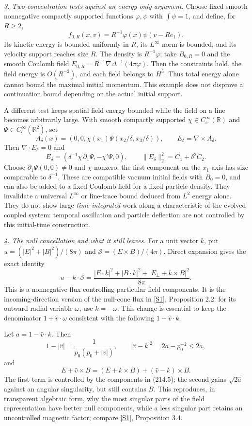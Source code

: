 \documentclass[11pt,a4paper]{article}
\newcommand{\R}{\mathbb{R}}
\newcommand{\sref}[2]{\hyperlink{source:#1:#2}{[S#2]}}
\begin{document}
\textit{3. Two concentration tests against an energy-only argument.}
Choose fixed smooth nonnegative compactly supported functions $\varphi,\psi$
with $\int\psi=1$, and define, for $R\ge2$,
\[
 f_{0,R}(x,v)=R^{-1}\varphi(x)\psi(v-Re_1).
\]
Its kinetic energy is bounded uniformly in $R$, its $L^\infty$ norm is
bounded, and its velocity support reaches size $R$. The density is
$R^{-1}\varphi$; take $B_{0,R}=0$ and the smooth Coulomb field
$E_{0,R}=R^{-1}\nabla\Delta^{-1}(4\pi\varphi)$. Then the constraints hold,
the field energy is $O(R^{-2})$, and each field belongs to $H^5$.
Thus total energy alone cannot bound the maximal initial momentum. This
example does not disprove a continuation bound depending on the actual
initial support.

A different test keeps spatial field energy bounded while the field on a
line becomes arbitrarily large. With smooth compactly supported
$\chi\in C_c^\infty(\R)$ and $\Psi\in C_c^\infty(\R^2)$, set
\[
 A_\delta(x)=(0,0,\chi(x_1)\Psi(x_2/\delta,x_3/\delta)),\qquad
 E_\delta=\nabla\times A_\delta.
\]
Then $\nabla\cdot E_\delta=0$ and
\[
 E_\delta=(\delta^{-1}\chi\,\partial_1\Psi,
                    -\chi'\Psi,0),\qquad
 \|E_\delta\|_2^2=C_1+\delta^2 C_2.
\]
Choose $\partial_1\Psi(0,0)\ne0$ and $\chi$ nonzero; the first component
on the $x_1$-axis has size comparable to $\delta^{-1}$. These are compatible
vacuum initial fields with $B_0=0$, and can also be added to a fixed Coulomb
field for a fixed particle density. They invalidate a universal
$L^\infty$ or line-trace bound deduced from $L^2$ energy alone. They do not
show large \emph{time-integrated} work along a characteristic of the evolved
coupled system: temporal oscillation and particle deflection are not
controlled by this initial-time construction.

\textit{4. The null cancellation and what it still leaves.}
For a unit vector $k$, put
$u=(|E|^2+|B|^2)/(8\pi)$ and $\mathcal S=(E\times B)/(4\pi)$.
Direct expansion gives the exact identity
\[
 u-k\cdot\mathcal S
 =\frac{|E\cdot k|^2+|B\cdot k|^2+|E_\perp+k\times B|^2}{8\pi}.
                                                               \tag{214.5}
\]
This is a nonnegative flux controlling particular field components. It is
the incoming-direction version of the null-cone flux in
\sref{214}{1}, Proposition 2.2: for its outward radial variable $\omega$,
use $k=-\omega$. This change is essential to keep the denominator
$1+\widehat v\cdot\omega$ consistent with the following $1-\widehat v\cdot k$.

Let $a=1-\widehat v\cdot k$. Then
\[
 1-|\widehat v|=\frac{1}{p_0(p_0+|v|)},\qquad
 |\widehat v-k|^2=2a-p_0^{-2}\le2a,
\]
and
\[
 E+\widehat v\times B=(E+k\times B)+(\widehat v-k)\times B.
                                                               \tag{214.6}
\]
The first term is controlled by the components in (214.5); the second gains
$\sqrt{2a}$ against an angular singularity, but still contains $B$.
This reproduces, in transparent algebraic form, why the most singular
parts of the field representation have better null components, while a
less singular part retains an uncontrolled magnetic factor; compare
\sref{214}{1}, Proposition 3.4.
\end{document}

